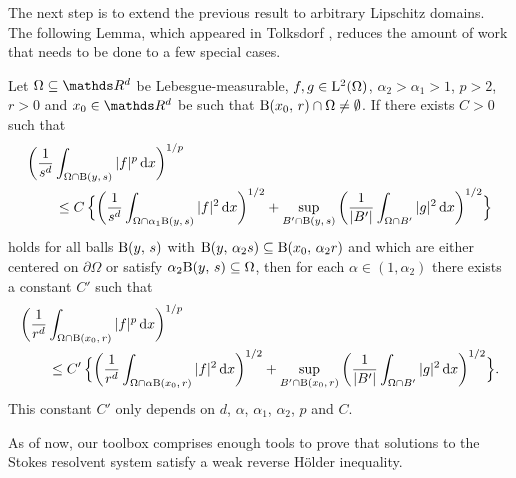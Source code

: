 The next step is to extend the previous result to arbitrary Lipschitz domains. 
The following Lemma, which appeared in Tolksdorf \cite[Lem. 4.2]{tolksdorf2017}, reduces the amount of work that needs to be done to a few special cases.

\begin{lem}
  \label{lem:ballsforballs}
  Let $\Omega \subseteq \R^d$ be Lebesgue-measurable, $f, g \in \mathrm{L}^2(\Omega)$, $\alpha_2 > \alpha_1 > 1$, $p > 2$, $r > 0$ and $x_0 \in \R^d$ be such that $\mathrm{B}(x_0,\, r) \cap \Omega \neq \emptyset$.
  If there exists $C > 0$ such that
  \begin{align*}
    &\bigg( \frac{1}{s^d} \int_{\Omega \cap \mathrm{B}(y,\, s)} |f|^p \, {\operatorname{d}\!{x}} \bigg)^{1/p} \\
    &\qquad\leq C\, \Big\{ \bigg( \frac{1}{s^d} \int_{\Omega \cap \alpha_1 \mathrm{B}(y,\, s)} |f|^2 \, {\operatorname{d}\!{x}} \bigg)^{1/2} + \sup_{B' \cap \mathrm{B}(y,\,s)} \bigg( \frac{1}{|B'|} \int_{\Omega \cap B'} |g|^2 \, {\operatorname{d}\!{x}} \bigg)^{1/2} \Big\}
  \end{align*}
  holds for all balls $\mathrm{B}(y,\,s)$ with $\mathrm{B}(y,\,\alpha_2 s) \subseteq \mathrm{B}(x_0,\, \alpha_2 r)$ and which are either centered on $\partial\Omega$ or satisfy $\alpha_2 \mathrm{B}(y,\,s) \subseteq \Omega$, then for each $\alpha \in (1,\alpha_2)$ there exists a constant $C'$ such that
  \begin{align*}
    &\bigg( \frac{1}{r^d} \int_{\Omega \cap \mathrm{B}(x_0,\, r)} |f|^p \, {\operatorname{d}\!{x}} \bigg)^{1/p} 
    \\
    &\qquad\leq C'\, \Big\{ \bigg( \frac{1}{r^d} \int_{\Omega \cap \alpha \mathrm{B}(x_0,\, r)} |f|^2 \, {\operatorname{d}\!{x}} \bigg)^{1/2} + \sup_{B' \cap \mathrm{B}(x_0,\,r)} \bigg( \frac{1}{|B'|} \int_{\Omega \cap B'} |g|^2 \, {\operatorname{d}\!{x}} \bigg)^{1/2} \Big\}.
  \end{align*}
  This constant $C'$ only depends on $d$, $\alpha$, $\alpha_1$, $\alpha_2$, $p$ and $C$.
\end{lem}


As of now, our toolbox comprises enough tools to prove that solutions to the Stokes resolvent system satisfy a weak reverse H\"older inequality.

